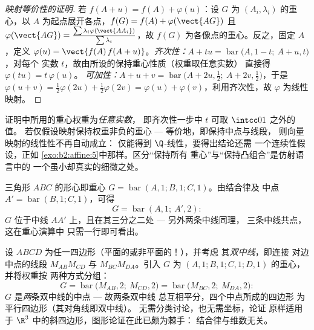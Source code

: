 \begin{proof}[映射等价性的证明]
若 $f(A + u) = f(A) + \varphi(u)$：设 $G$ 为 $(A_i,
\lambda_i)$ 的重心，以 $A$ 为起点展开各点，$f(G) = f(A) +
\varphi(\vect{AG})$ 且 $\varphi(\vect{AG}) =
\frac{\sum\lambda_i\varphi(\vect{AA_i})}{\sum\lambda_i}$，故 $f(G)$
为各像点的重心。反之，固定 $A$，定义
$\varphi(u) = \vect{f(A)\,f(A + u)}$。\emph{齐次性：}$A + tu =
\operatorname{bar}\bigl(A, 1-t;\ A + u, t\bigr)$，对每个
实数 $t$，故由所设的保持重心性质（权重取任意实数）
直接得 $\varphi(tu) = t\,\varphi(u)$。
\emph{可加性：}$A + u + v = \operatorname{bar}\bigl(A + 2u,
\tfrac12;\ A + 2v, \tfrac12\bigr)$，于是 $\varphi(u + v) =
\tfrac12\varphi(2u) + \tfrac12\varphi(2v) = \varphi(u) +
\varphi(v)$，利用齐次性，故 $\varphi$ 为线性映射。
\end{proof}

\begin{remark}
证明中所用的重心权重为\emph{任意实数}，
即齐次性一步中 $t$ 可取 $\intcc01$ 之外的值。
若仅假设映射保持权重非负的重心 ---
等价地，即保持中点与线段，
则向量映射的线性性不再自动成立：
仅能得到 $\Q$-线性，要得出结论还需
一个连续性假设，正如
\cref{exo:b2:affine:5}中那样。区分“保持所有
重心”与“保持凸组合”是仿射语言中的
一个虽小却真实的细微之处。
\end{remark}

\begin{example}[经典的重心几何]\label{ex:b2:affine:median}
三角形 $ABC$ 的形心即重心 $G =
\operatorname{bar}(A,1; B,1; C,1)$。由结合律及
中点 $A' = \operatorname{bar}(B, 1; C, 1)$，可得
\[
G = \operatorname{bar}(A, 1;\ A', 2) :
\]
$G$ 位于中线 $AA'$ 上，且在其三分之二处 --- 另外两条中线同理，
三条中线共点，这在重心演算中
只需一行即可看出。
\end{example}

\begin{example}\label{ex:b2:affine:bimedians}
设 $ABCD$ 为任一四边形（平面的或非平面的！），并考虑
其\emph{双中线}，即连接
对边中点的线段 $M_{AB}M_{CD}$ 与 $M_{BC}M_{DA}$。引入
$G$ 为 $(A,1; B,1; C,1; D,1)$ 的重心，并将权重按
两种方式分组：
\[
G = \operatorname{bar}\bigl(M_{AB}, 2;\ M_{CD}, 2\bigr)
= \operatorname{bar}\bigl(M_{BC}, 2;\ M_{DA}, 2\bigr) :
\]
$G$ 是\emph{两}条双中线的中点 --- 故两条双中线
总互相平分，四个中点所成的四边形
为平行四边形（其对角线即双中线）。
无需分类讨论，也无需坐标，论证
原样适用于
$\R^3$ 中的斜四边形，图形论证在此已颇为棘手：
结合律与维数无关。
\end{example}

